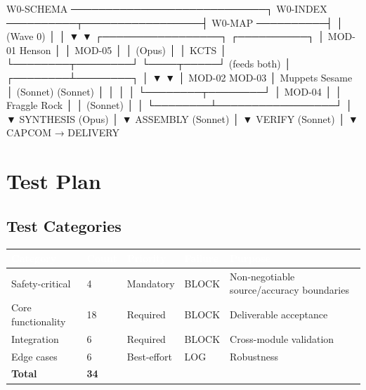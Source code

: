 \documentclass[11pt,letterpaper]{article}
\newcommand{\tableheader}[1]{\textbf{\sffamily\textcolor{white}{#1}}}
\begin{document}
\begin{asciibox}
W0-SCHEMA ────────────────────────────┐
W0-INDEX  ──────────┬─────────────────┤
W0-MAP    ──────────┤                 │
          (Wave 0)  │                 │
                    ▼                 ▼
          ┌─────────────────┐  ┌──────────┐
          │  MOD-01 Henson  │  │  MOD-05  │
          │   (Opus)        │  │  KCTS    │
          └────────┬────────┘  └────┬─────┘
              (feeds both)          │
         ┌────────┴────────┐        │
         ▼                 ▼        │
    MOD-02            MOD-03        │
    Muppets           Sesame        │
    (Sonnet)          (Sonnet)      │
         │                 │        │
         └────────┬────────┘        │
    MOD-04        │                 │
    Fraggle Rock  │                 │
    (Sonnet)      │                 │
         └────────┴─────────────────┘
                    │
                    ▼
            SYNTHESIS (Opus)
                    │
                    ▼
            ASSEMBLY (Sonnet)
                    │
                    ▼
            VERIFY (Sonnet)
                    │
                    ▼
            CAPCOM → DELIVERY
\end{asciibox}

\section{Test Plan}

\subsection{Test Categories}

\begin{center}
\begin{tabularx}{\textwidth}{L{3.5cm}C{1.5cm}L{2.5cm}L{2cm}X}
\toprule
{}
\tableheader{Category} & \tableheader{Count} & \tableheader{Priority} & \tableheader{Failure} & \tableheader{Purpose} \\
\midrule
Safety-critical & 4 & Mandatory & BLOCK & Non-negotiable source/accuracy boundaries \\
Core functionality & 18 & Required & BLOCK & Deliverable acceptance \\
Integration & 6 & Required & BLOCK & Cross-module validation \\
Edge cases & 6 & Best-effort & LOG & Robustness \\
\midrule
\textbf{Total} & \textbf{34} & & & \\
\bottomrule
\end{tabularx}
\end{center}
\end{document}
